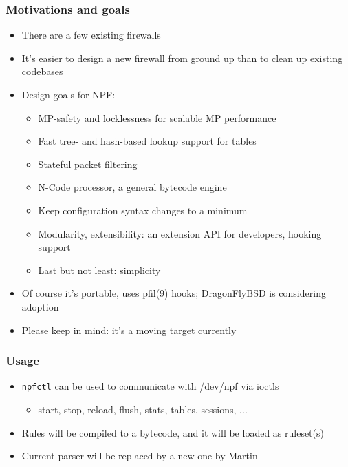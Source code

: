 \documentclass{beamer}
\begin{document}
\begin{frame}
\frametitle{Motivations and goals}
\begin{itemize}
	\item There are a few existing firewalls
	\item It's easier to design a new firewall from ground up than to clean up existing codebases
	\item Design goals for NPF:
	\begin{itemize}
		\item MP-safety and locklessness for scalable MP performance
		\item Fast tree- and hash-based lookup support for tables
		\item Stateful packet filtering
		\item N-Code processor, a general bytecode engine
		\item Keep configuration syntax changes to a minimum
		\item Modularity, extensibility: an extension API for developers, hooking support
		\item Last but not least: simplicity
	\end{itemize}
	\item Of course it's portable, uses pfil(9) hooks; DragonFlyBSD is considering adoption 
	\item Please keep in mind: it's a moving target currently
\end{itemize}
\end{frame}

\begin{frame}
\frametitle{Usage}
\begin{itemize}
	\item \texttt{npfctl} can be used to communicate with /dev/npf via ioctls
		\begin{itemize}
			\item start, stop, reload, flush, stats, tables, sessions, ...
		\end{itemize}
	\item Rules will be compiled to a bytecode, and it will be loaded as ruleset(s)
	\item Current parser will be replaced by a new one by Martin
\end{itemize}
\end{frame}
\end{document}
